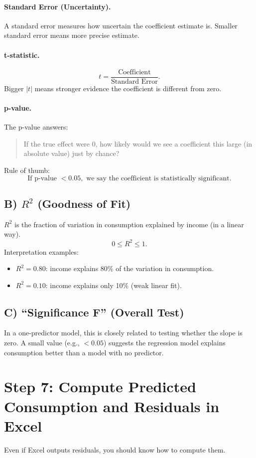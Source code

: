 \documentclass[11pt]{article}
\begin{document}
\paragraph{Standard Error (Uncertainty).}
A standard error measures how uncertain the coefficient estimate is. Smaller standard error means more precise estimate.

\paragraph{t-statistic.}
\[
t = \frac{\text{Coefficient}}{\text{Standard Error}}.
\]
Bigger $|t|$ means stronger evidence the coefficient is different from zero.

\paragraph{p-value.}
The p-value answers:
\begin{quote}
If the true effect were 0, how likely would we see a coefficient this large (in absolute value) just by chance?
\end{quote}
Rule of thumb:
\[
\text{If p-value } < 0.05, \text{ we say the coefficient is statistically significant.}
\]

\subsection*{B) $R^2$ (Goodness of Fit)}
$R^2$ is the fraction of variation in consumption explained by income (in a linear way).
\[
0 \le R^2 \le 1.
\]
Interpretation examples:
\begin{itemize}
  \item $R^2 = 0.80$: income explains 80\% of the variation in consumption.
  \item $R^2 = 0.10$: income explains only 10\% (weak linear fit).
\end{itemize}

\subsection*{C) ``Significance F'' (Overall Test)}
In a one-predictor model, this is closely related to testing whether the slope is zero.
A small value (e.g., $<0.05$) suggests the regression model explains consumption better than a model with no predictor.

\newpage
\section*{Step 7: Compute Predicted Consumption and Residuals in Excel}
Even if Excel outputs residuals, you should know how to compute them.
\end{document}
